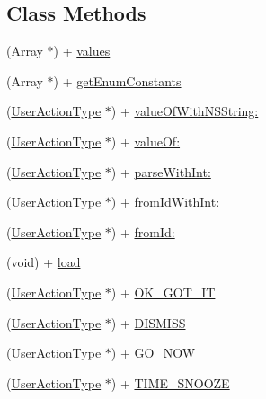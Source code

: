 \subsection*{Class Methods}
\begin{DoxyCompactItemize}
\item 
(Array $\ast$) + \hyperlink{interface_user_action_type_a11a3669fcb50df0f44d74b822b6299e5}{values}
\item 
(Array $\ast$) + \hyperlink{interface_user_action_type_abc5e48dc741d0c831a470baafe10fa74}{get\+Enum\+Constants}
\item 
(\hyperlink{interface_user_action_type}{User\+Action\+Type} $\ast$) + \hyperlink{interface_user_action_type_a7cdaaa54bfc01fe040be2d8576914e32}{value\+Of\+With\+N\+S\+String\+:}
\item 
(\hyperlink{interface_user_action_type}{User\+Action\+Type} $\ast$) + \hyperlink{interface_user_action_type_abe7aca43ef3da73d22058d469911822a}{value\+Of\+:}
\item 
(\hyperlink{interface_user_action_type}{User\+Action\+Type} $\ast$) + \hyperlink{interface_user_action_type_aba9c279c49ed034d1a65b7176e86a9e1}{parse\+With\+Int\+:}
\item 
(\hyperlink{interface_user_action_type}{User\+Action\+Type} $\ast$) + \hyperlink{interface_user_action_type_a70f5144137520546089ce281d529aed6}{from\+Id\+With\+Int\+:}
\item 
(\hyperlink{interface_user_action_type}{User\+Action\+Type} $\ast$) + \hyperlink{interface_user_action_type_afb52acf3c669ab8d1332d2f22cc7e9d1}{from\+Id\+:}
\item 
(void) + \hyperlink{interface_user_action_type_a1898d784983e128f1362eece0926123d}{load}
\item 
(\hyperlink{interface_user_action_type}{User\+Action\+Type} $\ast$) + \hyperlink{interface_user_action_type_ac0c54496980dfbf05c758bd84faeef47}{O\+K\+\_\+\+G\+O\+T\+\_\+\+I\+T}
\item 
(\hyperlink{interface_user_action_type}{User\+Action\+Type} $\ast$) + \hyperlink{interface_user_action_type_a9dc4fac09709d518a4861d075cef0073}{D\+I\+S\+M\+I\+S\+S}
\item 
(\hyperlink{interface_user_action_type}{User\+Action\+Type} $\ast$) + \hyperlink{interface_user_action_type_a1984d7a77e356f0364145c0c897efa0e}{G\+O\+\_\+\+N\+O\+W}
\item 
(\hyperlink{interface_user_action_type}{User\+Action\+Type} $\ast$) + \hyperlink{interface_user_action_type_a62e57a9ec23f56259d946433cbd58ca9}{T\+I\+M\+E\+\_\+\+S\+N\+O\+O\+Z\+E}
\end{DoxyCompactItemize}


